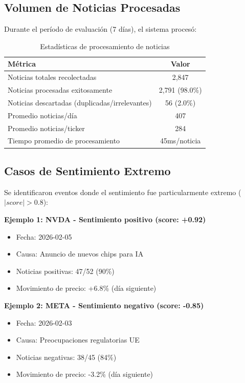 \documentclass[12pt,a4paper]{report}
\begin{document}
\subsection{Volumen de Noticias Procesadas}

Durante el período de evaluación (7 días), el sistema procesó:

\begin{table}[H]
\centering
\caption{Estadísticas de procesamiento de noticias}
\label{tab:noticias}
\begin{tabular}{lc}
\toprule
\textbf{Métrica} & \textbf{Valor} \\
\midrule
Noticias totales recolectadas & 2,847 \\
Noticias procesadas exitosamente & 2,791 (98.0\%) \\
Noticias descartadas (duplicadas/irrelevantes) & 56 (2.0\%) \\
Promedio noticias/día & 407 \\
Promedio noticias/ticker & 284 \\
Tiempo promedio de procesamiento & 45ms/noticia \\
\bottomrule
\end{tabular}
\end{table}

\subsection{Casos de Sentimiento Extremo}

Se identificaron eventos donde el sentimiento fue particularmente extremo ($|score| > 0.8$):

\textbf{Ejemplo 1: NVDA - Sentimiento positivo (score: +0.92)}
\begin{itemize}
    \item Fecha: 2026-02-05
    \item Causa: Anuncio de nuevos chips para IA
    \item Noticias positivas: 47/52 (90\%)
    \item Movimiento de precio: +6.8\% (día siguiente)
\end{itemize}

\textbf{Ejemplo 2: META - Sentimiento negativo (score: -0.85)}
\begin{itemize}
    \item Fecha: 2026-02-03
    \item Causa: Preocupaciones regulatorias UE
    \item Noticias negativas: 38/45 (84\%)
    \item Movimiento de precio: -3.2\% (día siguiente)
\end{itemize}
\end{document}
